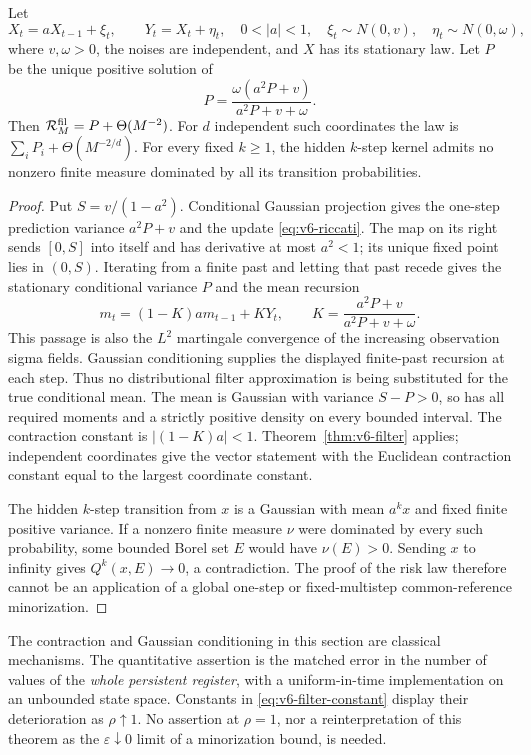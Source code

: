 \begin{corollary}\label{cor:v6-gaussian}
Let
\begin{equation}
 X_t=aX_{t-1}+\xi_t,\qquad Y_t=X_t+\eta_t,
 \quad 0<|a|<1,\quad
 \xi_t\sim N(0,v),\quad\eta_t\sim N(0,\omega),            \label{eq:v6-ar}
\end{equation}
where $v,\omega>0$, the noises are independent, and $X$ has its stationary
law. Let $P$ be the unique positive solution of
\begin{equation}
 P=\frac{\omega(a^2P+v)}{a^2P+v+\omega}.
                                                        \label{eq:v6-riccati}
\end{equation}
Then $\mathcal R_M^{\rm fil}=P+\Theta(M^{-2})$. For $d$ independent
such coordinates the law is $\sum_iP_i+\Theta(M^{-2/d})$.
For every fixed $k\ge1$, the hidden $k$-step kernel admits no nonzero
finite measure dominated by all its transition probabilities.
\end{corollary}
\begin{proof}
Put $S=v/(1-a^2)$. Conditional Gaussian projection gives the one-step
prediction variance $a^2P+v$ and the update \eqref{eq:v6-riccati}.
The map on its right sends $[0,S]$ into itself and has derivative at
most $a^2<1$; its unique fixed point lies in $(0,S)$. Iterating from
a finite past and letting that past recede gives the stationary
conditional variance $P$ and the mean recursion
\[
 m_t=(1-K)a m_{t-1}+KY_t,\qquad
 K=\frac{a^2P+v}{a^2P+v+\omega}.
\]
This passage is also the $L^2$ martingale convergence of the increasing
observation sigma fields. Gaussian conditioning supplies the displayed
finite-past recursion at each step. Thus no distributional filter
approximation is being substituted for the true conditional mean.
The mean is Gaussian with variance $S-P>0$, so has all required
moments and a strictly positive density on every bounded interval.
The contraction constant is $|(1-K)a|<1$.
Theorem~\ref{thm:v6-filter} applies; independent coordinates give the
vector statement with the Euclidean contraction constant equal to the
largest coordinate constant.

The hidden $k$-step transition from $x$ is a Gaussian with mean $a^kx$
and fixed finite positive variance. If a nonzero finite measure $\nu$
were dominated by every such probability, some bounded Borel set $E$
would have $\nu(E)>0$. Sending $x$ to infinity gives
$Q^k(x,E)\to0$, a contradiction. The proof of the risk law therefore
cannot be an application of a global one-step or fixed-multistep
common-reference minorization.
\end{proof}

The contraction and Gaussian conditioning in this section are classical
mechanisms. The quantitative assertion is the matched error in the
number of values of the \emph{whole persistent register}, with a
uniform-in-time implementation on an unbounded state space. Constants
in \eqref{eq:v6-filter-constant} display their deterioration as
$\rho\uparrow1$. No assertion at $\rho=1$, nor a reinterpretation of
this theorem as the $\varepsilon\downarrow0$ limit of a minorization
bound, is needed.
